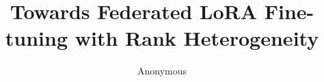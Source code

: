 \documentclass[runningheads]{llncs}
\begin{document}
%
\title{Towards Federated LoRA Fine-tuning with Rank Heterogeneity}
%
%
\author{Anonymous}
%

%
\maketitle              %
%



\newcommand{\etal}{\textit{et~al.}\xspace}
\newcommand{\eg}{\textit{e.g.},\xspace}
\newcommand{\ie}{\textit{i.e.},\xspace}
\newcommand{\etc}{etc.\xspace}

\newcommand\figref[1]{Fig.~\ref{#1}}
\newcommand\algref[1]{Algorithm~\ref{#1}}
\newcommand\tabref[1]{Table~\ref{#1}}
\newcommand\secref[1]{Sec.~\ref{#1}}
\newcommand\equref[1]{Eq.~(\ref{#1})}
\newcommand\thmref[1]{Theorem ~\ref{#1}}
\newcommand\lemmaref[1]{Lemma ~\ref{#1}}
\newcommand\assumptionref[1]{Assumption ~\ref{#1}}
\newcommand\appref[1]{Appendix~\ref{#1}}
\newcommand\defref[1]{Definition~\ref{#1}}

\newcommand{\fakeparagraph}[1]{\vspace{1mm}\noindent\textbf{#1.}}
\newcommand{\sysname}{\text{DualAda}\xspace}

\newcommand{\algnote}[1]{\textcolor{blue}{\tt{// #1}}}

\newcommand{\TODO}[1]{\textbf{\color{red}{TODO: #1} }}
\newcommand{\TBD}[1]{\textbf{\color{blue}{TBD: #1} }}
\newcommand{\zimu}[1]{{\color{brown}{#1}}}
\newcommand{\boyi}[1]{{\color{blue}{#1}}}
\newcommand{\mym}[1]{{\color{teal}{#1}}}
\end{document}
